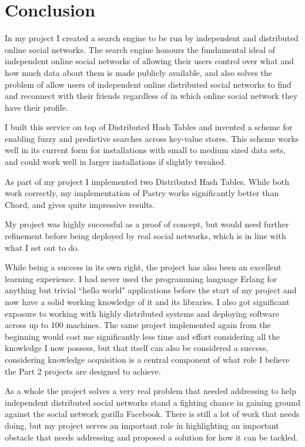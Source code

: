 

\chapter{Conclusion}
In my project I created a search engine to be run by independent and distributed online social networks. The search engine honours the fundamental ideal of independent online social networks of allowing their users control over what and how much data about them is made publicly available, and also solves the problem of allow users of independent online distributed social networks to find and reconnect with their friends regardless of in which online social network they have their profile.

I built this service on top of Distributed Hash Tables and invented a scheme for enabling fuzzy and predictive searches across key-value stores. This scheme works well in its current form for installations with small to medium sized data sets, and could work well in larger installations if slightly tweaked.

As part of my project I implemented two Distributed Hash Tables. While both work correctly, my implementation of Pastry works significantly better than Chord, and gives quite impressive results.

My project was highly successful as a proof of concept, but would need further refinement before being deployed by real social networks, which is in line with what I set out to do. 

\mbox{}

While being a success in its own right, the project has also been an excellent learning experience.
I had never used the programming language Erlang for anything but trivial ``hello world" applications before the start of my project and now have a solid working knowledge of it and its libraries. I also got significant exposure to working with highly distributed systems and deploying software across up to 100 machines.
The same project implemented again from the beginning would cost me significantly less time and effort considering all the knowledge I now possess, but that itself can also be considered a success, considering knowledge acquisition is a central component of what role I believe the Part 2 projects are designed to achieve.

\mbox{}

As a whole the project solves a very real problem that needed addressing to help independent distributed social networks stand a fighting chance in gaining ground against the social network gorilla Facebook. There is still a lot of work that needs doing, but my project serves an important role in highlighting an important obstacle that needs addressing and proposed a solution for how it can be tackled.
